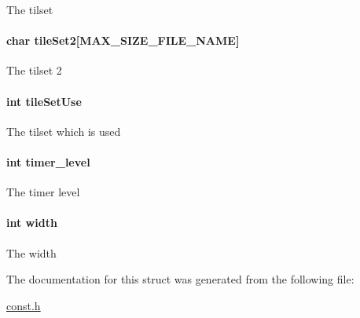 The tilset \hypertarget{struct_level_a31c790abec040f1888acf0e062d1c827}{
\paragraph[{tile\-Set2}]{\setlength{\rightskip}{0pt plus 5cm}char tile\-Set2\mbox{[}{\bf M\-A\-X\-\_\-\-S\-I\-Z\-E\-\_\-\-F\-I\-L\-E\-\_\-\-N\-A\-M\-E}\mbox{]}}}\label{struct_level_a31c790abec040f1888acf0e062d1c827}
The tilset 2 \hypertarget{struct_level_ad086ee40635033453f3e41bc143af7b7}{
\paragraph[{tile\-Set\-Use}]{\setlength{\rightskip}{0pt plus 5cm}int tile\-Set\-Use}}\label{struct_level_ad086ee40635033453f3e41bc143af7b7}
The tilset which is used \hypertarget{struct_level_a28c59da9677a9d7b98db49328a77dc3c}{
\paragraph[{timer\-\_\-level}]{\setlength{\rightskip}{0pt plus 5cm}int timer\-\_\-level}}\label{struct_level_a28c59da9677a9d7b98db49328a77dc3c}
The timer level \hypertarget{struct_level_a2474a5474cbff19523a51eb1de01cda4}{
\paragraph[{width}]{\setlength{\rightskip}{0pt plus 5cm}int width}}\label{struct_level_a2474a5474cbff19523a51eb1de01cda4}
The width 

The documentation for this struct was generated from the following file\-:\begin{DoxyCompactItemize}
\item 
\hyperlink{const_8h}{const.\-h}\end{DoxyCompactItemize}
